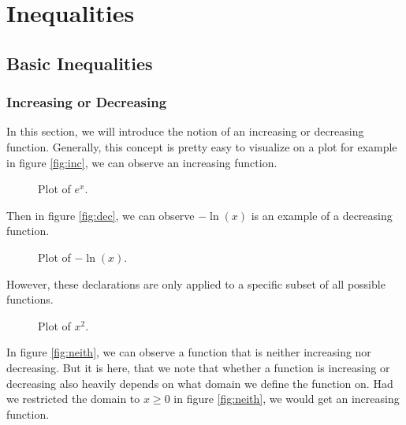 \edef\mychapter{Inequalities}
\edef\mychapterdate{July 7, 2024}

\chapter{\mychapter}

\section{Basic Inequalities}
\subsection{Increasing or Decreasing}
In this section, we will introduce the notion of an increasing or decreasing function. Generally, this concept is pretty easy to visualize on a plot for example in figure \eqref{fig:inc}, we can observe an increasing function.
\begin{figure}[h]
\centering
	\caption{Plot of $e^x$.}
	\label{fig:inc}
\end{figure}
Then in figure \eqref{fig:dec}, we can observe $-\ln(x)$ is an example of a decreasing function.
\begin{figure}[h]
\centering
	\caption{Plot of $-\ln(x)$.}
	\label{fig:dec}
\end{figure}
However, these declarations are only applied to a specific subset of all possible functions.
\begin{figure}[h]
\centering
	\caption{Plot of $x^2$.}
	\label{fig:neith}
\end{figure}
In figure \eqref{fig:neith}, we can observe a function that is neither increasing nor decreasing. But it is here, that we note that whether a function is increasing or decreasing also heavily depends on what domain we define the function on. Had we restricted the domain to $x\ge0$ in figure \eqref{fig:neith}, we would get an increasing function.

